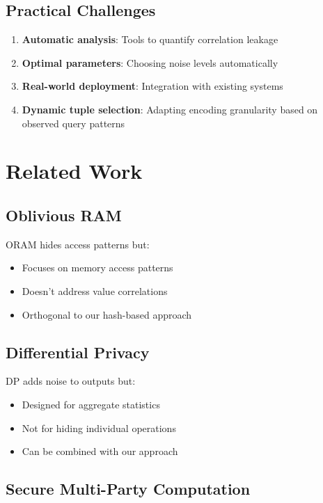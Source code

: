 \documentclass[11pt,final,hidelinks]{article}
\begin{document}
\subsection{Practical Challenges}

\begin{enumerate}
    \item \textbf{Automatic analysis}: Tools to quantify correlation leakage
    \item \textbf{Optimal parameters}: Choosing noise levels automatically
    \item \textbf{Real-world deployment}: Integration with existing systems
    \item \textbf{Dynamic tuple selection}: Adapting encoding granularity based on observed query patterns
\end{enumerate}

\section{Related Work}

\subsection{Oblivious RAM}

ORAM hides access patterns but:
\begin{itemize}
    \item Focuses on memory access patterns
    \item Doesn't address value correlations
    \item Orthogonal to our hash-based approach
\end{itemize}

\subsection{Differential Privacy}

DP adds noise to outputs but:
\begin{itemize}
    \item Designed for aggregate statistics
    \item Not for hiding individual operations
    \item Can be combined with our approach
\end{itemize}

\subsection{Secure Multi-Party Computation}
\end{document}
